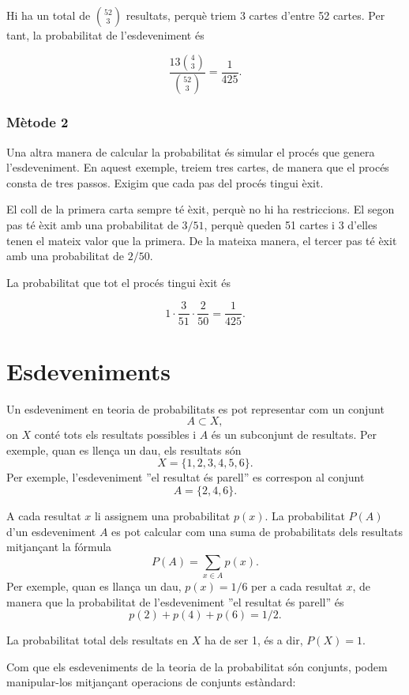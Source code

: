 Hi ha un total de ${52 \choose 3}$ resultats, perquè triem 3 cartes
d'entre 52 cartes. Per tant, la probabilitat de l'esdeveniment és


\[\frac{13 {4 \choose 3}}{{52 \choose 3}} = \frac{1}{425}.\]


\subsubsection*{Mètode 2}

Una altra manera de calcular la probabilitat és simular el procés que
genera l'esdeveniment. En aquest exemple, treiem tres cartes, de
manera que el procés consta de tres passos. Exigim que cada pas del
procés tingui èxit.

El coll de la primera carta sempre té èxit, perquè no hi ha
restriccions. El segon pas té èxit amb una probabilitat de $3/51$,
perquè queden 51 cartes i 3 d'elles tenen el mateix valor que la
primera. De la mateixa manera, el tercer pas té èxit amb una
probabilitat de $2/50$.

La probabilitat que tot el procés tingui èxit és


\[1 \cdot \frac{3}{51} \cdot \frac{2}{50} = \frac{1}{425}.\]


\section{Esdeveniments}

Un esdeveniment en teoria de probabilitats es pot representar com un
conjunt
\[A \subset X,\]
on $X$ conté tots els resultats possibles i $A$ és un subconjunt de
resultats. Per exemple, quan es llença un dau, els resultats són
\[X = \{1,2,3,4,5,6\}.\]
Per exemple, l'esdeveniment ''el resultat és parell'' es correspon
al conjunt
\[A = \{2,4,6\}.\]


A cada resultat $x$ li assignem una probabilitat $p(x)$. La
probabilitat $P(A)$ d'un esdeveniment $A$ es pot calcular com una
suma de probabilitats dels resultats mitjançant la fórmula
\[P(A) = \sum_{x \in A} p(x).\]
Per exemple, quan es llança un dau, $p(x)=1/6$ per a cada resultat
$x$, de manera que la probabilitat de l'esdeveniment ''el resultat
és parell'' és
\[p(2)+p(4)+p(6)=1/2.\]


La probabilitat total dels resultats en $X$ ha de ser 1, és a dir,
$P(X)=1$.

Com que els esdeveniments de la teoria de la probabilitat són
conjunts, podem manipular-los mitjançant operacions de conjunts
estàndard:



